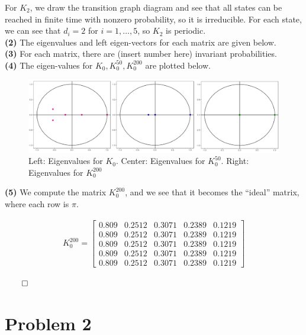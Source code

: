 \documentclass[5pt]{article}
\begin{document}
For $K_2$, we draw the transition graph diagram and see that all states can be reached in finite time with nonzero probability, so it is irreducible. For each state, we can see that $d_i = 2$ for $i = 1, \ldots, 5$, so $K_2$ is periodic. \\

\textbf{(2)} The eigenvalues and left eigen-vectors for each matrix are given below. \\


\textbf{(3)} For each matrix, there are (insert number here) invariant probabilities. \\


\textbf{(4)} The eigen-values for $K_0, K_0^{50}, K_{0}^{200}$ are plotted below. \\

\begin{figure}[H]
\begin{center}
\includegraphics[width = 1 \columnwidth]{eigen_values}
\caption{Left: Eigenvalues for $K_0$. Center: Eigenvalues for $K_0^{50}$. Right: Eigenvalues for $K_0^{200}$}
\end{center}
\end{figure}


\textbf{(5)} We compute the matrix $K_0^{200}$, and we see that it becomes the ``ideal'' matrix, where each row is $\pi$.

\begin{align*}
K_0^{200} = 
	\begin{bmatrix}
		0.809 & 0.2512 & 0.3071 & 0.2389 & 0.1219 \\		
		0.809 & 0.2512 & 0.3071 & 0.2389 & 0.1219 \\	
		0.809 & 0.2512 & 0.3071 & 0.2389 & 0.1219 \\	
		0.809 & 0.2512 & 0.3071 & 0.2389 & 0.1219 \\	
		0.809 & 0.2512 & 0.3071 & 0.2389 & 0.1219
	\end{bmatrix}
\end{align*}

\hfill $\qed$


\section{Problem 2}
\end{document}
